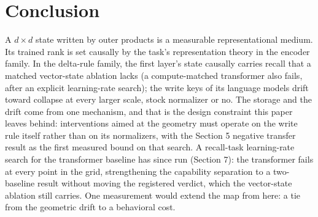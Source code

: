 \section{Conclusion}

A $d \times d$ state written by outer products is a measurable
representational medium. Its trained rank is set causally by the
task's representation theory in the encoder family. In the delta-rule
family, the first layer's state causally carries recall that a matched
vector-state ablation lacks (a compute-matched transformer also fails,
after an explicit learning-rate search); the write keys of its language
models drift toward collapse at every larger scale, stock normalizer
or no. The storage and the drift come from one mechanism, and
that is the design constraint this paper leaves behind: interventions
aimed at the geometry must operate on the write rule itself rather
than on its normalizers, with the Section 5 negative transfer result
as the first measured bound on that search. A recall-task
learning-rate search for the transformer baseline has since run
(Section 7): the transformer fails at every point in the grid,
strengthening the capability separation to a two-baseline result
without moving the registered verdict, which the vector-state ablation
still carries. One measurement would extend the map from here: a tie
from the geometric drift to a behavioral cost.

